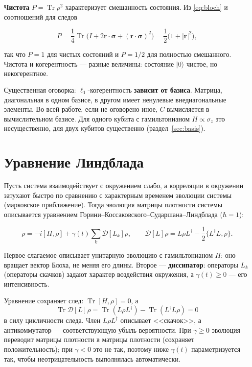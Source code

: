 \documentclass[12pt,a4paper]{report}
\numberwithin{equation}{chapter}
\newcommand{\Tr}{\operatorname{Tr}}
\newcommand{\ket}[1]{|#1\rangle}
\begin{document}
\textbf{Чистота} $P=\Tr\rho^2$ характеризует смешанность состояния. Из
\eqref{eq:bloch} и соотношений для следов
\begin{keybox}
\begin{equation}
P=\frac14\Tr\bigl(I+2\mathbf r\cdot\boldsymbol\sigma+(\mathbf r\cdot\boldsymbol\sigma)^2\bigr)
=\frac12\bigl(1+|\mathbf r|^2\bigr),
\end{equation}
\end{keybox}
так что $P=1$ для чистых состояний и $P=1/2$ для полностью смешанного.
Чистота и когерентность --- разные величины: состояние $\ket0$ чистое, но
некогерентное.

Существенная оговорка: $\ell_1$-когерентность \textbf{зависит от базиса}.
Матрица, диагональная в одном базисе, в другом имеет ненулевые
внедиагональные элементы. Во всей работе, если не оговорено иное, $C$
вычисляется в вычислительном базисе. Для одного кубита с гамильтонианом
$H\propto\sigma_z$ это несущественно, для двух кубитов существенно
(раздел~\ref{sec:basis}).

\section{Уравнение Линдблада}

Пусть система взаимодействует с окружением слабо, а корреляции в окружении
затухают быстро по сравнению с характерным временем эволюции системы
(марковское приближение). Тогда эволюция матрицы плотности системы
описывается уравнением Горини--Коссаковского--Сударшана--Линдблада
($\hbar=1$):
\begin{keybox}
\begin{equation}
\dot\rho=-i[H,\rho]+\gamma(t)\sum_k\mathcal D[L_k]\rho,\qquad
\mathcal D[L]\rho=L\rho L^\dagger-\frac12\{L^\dagger L,\rho\}.
\label{eq:lindblad}
\end{equation}
\end{keybox}
Первое слагаемое описывает унитарную эволюцию с гамильтонианом $H$: оно
вращает вектор Блоха, не меняя его длины. Второе --- \textbf{диссипатор}:
операторы $L_k$ (операторы скачков) задают характер воздействия окружения, а
$\gamma(t)\ge0$ --- его интенсивность.

Уравнение сохраняет след: $\Tr[H,\rho]=0$, а
\[
\Tr\mathcal D[L]\rho=\Tr(L\rho L^\dagger)-\Tr(L^\dagger L\rho)=0
\]
в силу цикличности следа. Член $L\rho L^\dagger$ описывает <<скачок>>, а
антикоммутатор --- соответствующую убыль вероятности. При $\gamma\ge0$
эволюция переводит матрицы плотности в матрицы плотности (сохраняет
положительность); при $\gamma<0$ это не так, поэтому ниже $\gamma(t)$
параметризуется так, чтобы неотрицательность выполнялась автоматически.
\end{document}
